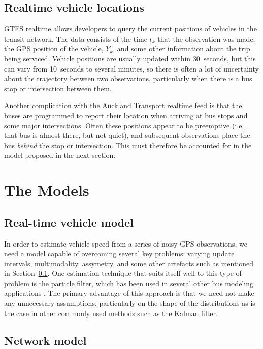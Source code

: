 \documentclass[times, doublespace]{anzsauth}
\begin{document}
\subsection{Realtime vehicle locations}
\label{sec:realtime_data}

GTFS realtime allows developers to query the current positions of vehicles
in the transit network.
The data consists of the time $t_k$ that the observation was made,
the GPS position of the vehicle, $Y_k$, 
and some other information about the trip being serviced.
Vehicle positions are usually updated within 30~seconds,
but this can vary from 10~seconds to several minutes,
so there is often a lot of uncertainty about the trajectory
between two observations, particularly when there is a bus stop
or intersection between them.

Another complication with the Auckland Transport realtime feed is that
the buses are programmed to report their location when arriving at
bus stops and some major intersections.
Often these positions appear to be preemptive (i.e., that bus is almost there, 
but not quiet),
and subsequent observations place the bus \emph{behind} the stop or intersection.
This must therefore be accounted for in the model proposed in the next section.




\section{The Models}
\label{sec:models}

\subsection{Real-time vehicle model}
\label{sec:pf}

In order to estimate vehicle speed from a series of noisy GPS observations,
we need a model capable of overcoming several key problems:
varying update intervals, multimodality, assymetry, 
and some other artefacts such as mentioned in Section~\ref{sec:realtime_data}.
One estimation technique that suits itself well to this type of problem
is the particle filter, 
which has been used in several other bus modeling applications
\citep{Hans_2015}.
The primary advantage of this approach is that we need not make any 
unnecessary assumptions, particularly on the shape of the distributions 
as is the case in other commonly used methods such as the Kalman filter.


\subsection{Network model}
\label{sec:kf}
\end{document}

